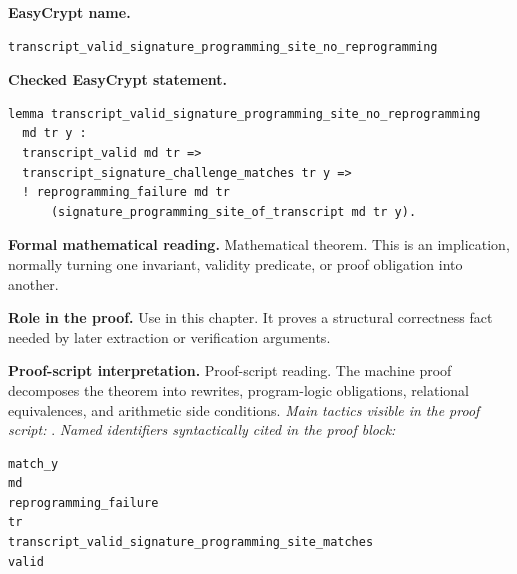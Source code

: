 \begin{formaltheorem}
\noindent\textbf{EasyCrypt name.}
\begin{lstlisting}[language=EasyCrypt,basicstyle=\ttfamily\scriptsize]
transcript_valid_signature_programming_site_no_reprogramming
\end{lstlisting}
\noindent\textbf{Checked EasyCrypt statement.}
\begin{lstlisting}[language=EasyCrypt,basicstyle=\ttfamily\scriptsize]
lemma transcript_valid_signature_programming_site_no_reprogramming
  md tr y :
  transcript_valid md tr =>
  transcript_signature_challenge_matches tr y =>
  ! reprogramming_failure md tr
      (signature_programming_site_of_transcript md tr y).
\end{lstlisting}
\noindent\textbf{Formal mathematical reading.}
Mathematical theorem. This is an implication, normally turning one invariant, validity predicate, or proof obligation into another.

\noindent\textbf{Role in the proof.}
Use in this chapter. It proves a structural correctness fact needed by later extraction or verification arguments.

\noindent\textbf{Proof-script interpretation.}
Proof-script reading. The machine proof decomposes the theorem into rewrites, program-logic obligations, relational equivalences, and arithmetic side conditions.
\emph{Main tactics visible in the proof script:} .
\emph{Named identifiers syntactically cited in the proof block:}
\begin{lstlisting}[language=EasyCrypt,basicstyle=\ttfamily\scriptsize]
match_y
md
reprogramming_failure
tr
transcript_valid_signature_programming_site_matches
valid
\end{lstlisting}

\end{formaltheorem}

